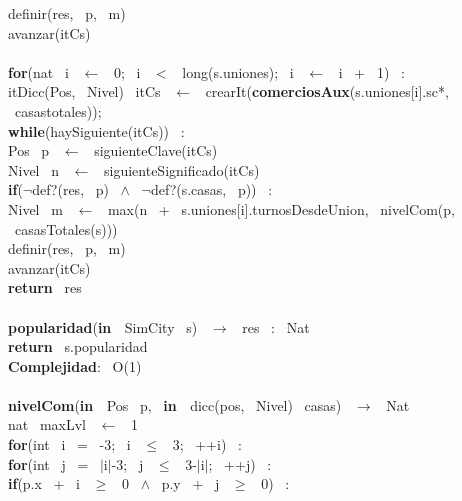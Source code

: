 \begin{Algoritmos}
\indent \indent \indent definir(res, \ p, \ m)\\
\indent \indent avanzar(itCs)\\
\\
\indent \textbf{for}(nat \ i \ $\leftarrow$ \ 0; \ i \ $<$ \ long(s.uniones); \ i \ $\leftarrow$ \ i \ + \ 1) \ : \ \\
\indent \indent itDicc(Pos, \ Nivel) \ itCs \ $\leftarrow$ \ crearIt(\textbf{comerciosAux}(s.uniones[i].sc*, \ casastotales));\\
\indent \indent \textbf{while}(haySiguiente(itCs)) \ :\\
\indent \indent \indent Pos \ p \ $\leftarrow$ \ siguienteClave(itCs)\\
\indent \indent \indent Nivel \ n \ $\leftarrow$ \ siguienteSignificado(itCs)\\
\indent \indent \indent \textbf{if}($\neg$def?(res, \ p) \ $\wedge$ \ $\neg$def?(s.casas, \ p)) \ :\\
\indent \indent \indent \indent Nivel \ m \ $\leftarrow$ \ max(n \ + \ s.uniones[i].turnosDesdeUnion, \ nivelCom(p, \ casasTotales(s)))\\
\indent \indent \indent \indent definir(res, \ p, \ m)\\
\indent \indent \indent avanzar(itCs)\\
\indent \textbf{return} \ res\\
\noindent\makebox[\linewidth]{\rule{\textwidth}{0.4pt}}
\\
\noindent\makebox[\linewidth]{\rule{\textwidth}{0.4pt}}
\textbf{popularidad}(\textbf{in \ }SimCity \ s) \ $\rightarrow $ \ res \ : \ Nat\\
\indent \textbf{return} \ s.popularidad\\
\textbf{Complejidad}: \ O(1)\\
\noindent\makebox[\linewidth]{\rule{\textwidth}{0.4pt}}
\\
\noindent\makebox[\linewidth]{\rule{\textwidth}{0.4pt}}
\textbf{nivelCom}(\textbf{in \ }Pos \ p, \ \textbf{in \ }dicc(pos, \ Nivel) \ casas) \ $\rightarrow $ \ Nat\\
\indent nat \ maxLvl \ $\leftarrow$ \ 1\\
\indent \textbf{for}(int \ i \ = \ -3; \ i \ $\leq$ \ 3; \ ++i) \ :\\
\indent \indent \textbf{for}(int \ j \ = \ $\mid$i$\mid$-3; \ j \ $\leq$ \ 3-$\mid$i$\mid$; \ ++j) \ :\\
\indent \indent \indent \textbf{if}(p.x \ + \ i \ $\geq$ \ 0 \ $\wedge$ \ p.y \ + \ j \ $\geq$ \ 0) \ :\\

\end{Algoritmos}
